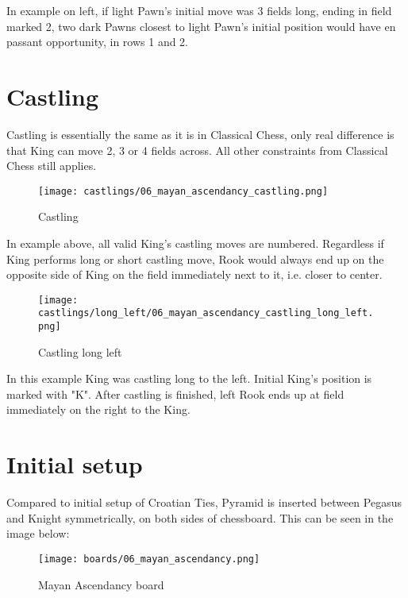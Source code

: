 In example on left, if light Pawn's initial move was 3 fields long, ending in field marked
2, two dark Pawns closest to light Pawn's initial position would have en passant opportunity,
in rows 1 and 2.

\clearpage %

\section*{Castling}

Castling is essentially the same as it is in Classical Chess, only real difference is that
King can move 2, 3 or 4 fields across. All other constraints from Classical Chess still
applies.

\noindent
\begin{figure}[!h]
\texttt{[image: castlings/06\_mayan\_ascendancy\_castling.png]}
\caption{Castling}
\label{fig:06_mayan_ascendancy_castling}
\end{figure}

In example above, all valid King's castling moves are numbered. Regardless if King performs
long or short castling move, Rook would always end up on the opposite side of King on the
field immediately next to it, i.e. closer to center.

\noindent
\begin{figure}[!h]
\texttt{[image: castlings/long\_left/06\_mayan\_ascendancy\_castling\_long\_left.png]}
\caption{Castling long left}
\label{fig:06_mayan_ascendancy_castling_long_left}
\end{figure}

In this example King was castling long to the left. Initial King's position is marked with "K".
After castling is finished, left Rook ends up at field immediately on the right to the King.

\clearpage %

\section*{Initial setup}

Compared to initial setup of Croatian Ties, Pyramid is inserted between Pegasus and Knight
symmetrically, on both sides of chessboard. This can be seen in the image below:

\noindent
\begin{figure}[h]
\texttt{[image: boards/06\_mayan\_ascendancy.png]}
\caption{Mayan Ascendancy board}
\label{fig:06_mayan_ascendancy}
\end{figure}

\clearpage %
